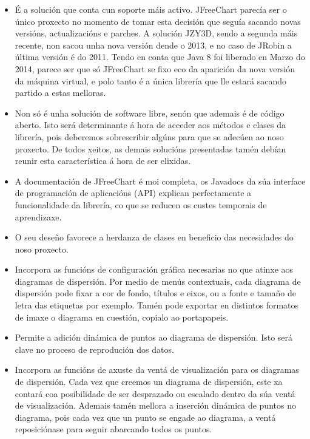\begin{itemize}
\item É a solución que conta cun soporte máis activo. JFreeChart parecía ser o único proxecto no momento de tomar esta decisión que seguía sacando novas versións, actualizacións e parches. A solución JZY3D, sendo a segunda máis recente, non sacou unha nova versión dende o 2013, e no caso de JRobin a última versión é do 2011. Tendo en conta que Java 8 foi liberado en Marzo do 2014, parece ser que só JFreeChart se fixo eco da aparición da nova versión da máquina virtual, e polo tanto é a única librería que lle estará sacando partido a estas melloras.
\item Non só é unha solución de software libre, senón que ademais é de código aberto. Isto será determinante á hora de acceder aos métodos e clases da librería, pois deberemos sobrescribir algúns para que se adecúen ao noso proxecto. De todos xeitos, as demais solucións presentadas tamén debían reunir esta característica á hora de ser elixidas.
\item A documentación de JFreeChart é moi completa, os Javadocs da súa interface de programación de aplicacións (API) explican perfectamente a funcionalidade da librería, co que se reducen os custes temporais de aprendizaxe.
\item O seu deseño favorece a herdanza de clases en beneficio das necesidades do noso proxecto.
\item Incorpora as funcións de configuración gráfica necesarias no que atinxe aos diagramas de dispersión. Por medio de menús contextuais, cada diagrama de dispersión pode fixar a cor de fondo, títulos e eixos, ou a fonte e tamaño de letra das etiquetas por exemplo. Tamén pode exportar en distintos formatos de imaxe o diagrama en cuestión, copialo ao portapapeis.
\item Permite a adición dinámica de puntos ao diagrama de dispersión. Isto será clave no proceso de reprodución dos datos.
\item Incorpora as funcións de axuste da ventá de visualización para os diagramas de dispersión. Cada vez que creemos un diagrama de dispersión, este xa contará coa posibilidade de ser desprazado ou escalado dentro da súa ventá de visualización. Ademais tamén mellora a inserción dinámica de puntos no diagrama, pois cada vez que un punto se engade ao diagrama, a ventá reposiciónase para seguir abarcando todos os puntos.
\end{itemize} 


